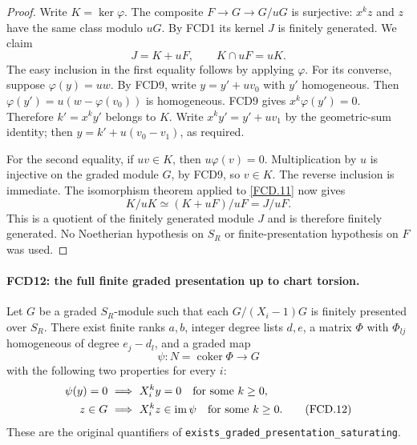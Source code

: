 \documentclass[11pt,a4paper]{article}
\numberwithin{equation}{section}
\theoremstyle{remark}\newtheorem{remark}[theorem]{Remark}
\begin{document}
\begin{proof}
Write $K=\ker\varphi$.  The composite
$F\to G\to G/uG$ is surjective: $x^kz$ and $z$ have the
same class modulo $uG$.  By FCD1 its kernel $J$ is finitely
generated.  We claim
\[
 J=K+uF,\qquad K\cap uF=uK.                          \tag{FCD.11}\label{FCD.11}
\]
The easy inclusion in the first equality follows by applying
$\varphi$.  For its converse, suppose $\varphi(y)=uw$.
By FCD9, write $y=y'+uv_0$ with $y'$ homogeneous.
Then $\varphi(y')=u(w-\varphi(v_0))$ is homogeneous.
FCD9 gives $x^k\varphi(y')=0$.  Therefore $k'=x^ky'$
belongs to $K$.  Write $x^ky'=y'+uv_1$ by the geometric-sum
identity; then $y=k'+u(v_0-v_1)$, as required.

For the second equality, if $uv\in K$, then
$u\varphi(v)=0$.  Multiplication by $u$ is injective on the
graded module $G$, by FCD9, so $v\in K$.  The reverse inclusion
is immediate.  The isomorphism theorem applied to \eqref{FCD.11}
now gives
\[
 K/uK\simeq (K+uF)/uF=J/uF.
\]
This is a quotient of the finitely generated module $J$ and is
therefore finitely generated.  No Noetherian hypothesis on $S_R$
or finite-presentation hypothesis on $F$ was used.
\end{proof}

\paragraph{FCD12: the full finite graded presentation up to chart torsion.}
\label{claim:FCD12}
Let $G$ be a graded $S_R$-module such that each
$G/(X_i-1)G$ is finitely presented over $S_R$.
There exist finite ranks $a,b$, integer degree lists $d,e$, a
matrix $\Phi$ with $\Phi_{lj}$ homogeneous of degree $e_j-d_l$,
and a graded map
\[
 \psi:N=\operatorname{coker}\Phi\longrightarrow G
\]
with the following two properties for every $i$:
\begin{align}
 \psi(y)=0&\ \Longrightarrow\ X_i^ky=0
       \quad\hbox{for some }k\ge0,\nonumber\\
 z\in G&\ \Longrightarrow\ X_i^kz\in\operatorname{im}\psi
       \quad\hbox{for some }k\ge0.                  \tag{FCD.12}\label{FCD.12}
\end{align}
These are the original quantifiers of
\texttt{exists\_\allowbreak{}graded\_\allowbreak{}presentation\_\allowbreak{}saturating}.
\end{document}
